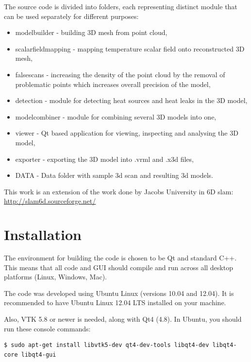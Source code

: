\documentclass[11pt]{article} %
\begin{document}
The source code is divided into folders, each representing distinct module that can be used separately for different purposes:

\begin{itemize}

\item modelbuilder - building 3D mesh from point cloud,
\item scalarfieldmapping - mapping temperature scalar field onto reconstructed 3D mesh,
\item falsescans - increasing the density of the point cloud by the removal of problematic points which increases overall precision of the model,
\item detection - module for detecting heat sources and heat leaks in the 3D model,
\item modelcombiner - module for combining several 3D models into one,
\item viewer - Qt based application for viewing, inspecting and analysing the 3D model,
\item exporter - exporting the 3D model into .vrml and .x3d files,
\item DATA - Data folder with sample 3d scan and resulting 3d models.

\end{itemize}

This work is an extension of the work done by Jacobs University in 6D slam: \url{http://slam6d.sourceforge.net/}

\newpage

\section{Installation}

The environment for building the code is chosen to be Qt and standard C++. This means that all code and GUI should compile and run across all desktop platforms (Linux, Windows, Mac).

The code was developed using Ubuntu Linux (versions 10.04 and 12.04). It is recommended to have Ubuntu Linux 12.04 LTS installed on your machine.

Also, VTK 5.8 or newer is needed, along with Qt4 (4.8). In Ubuntu, you should run these console commands:

\begin{verbatim}
$ sudo apt-get install libvtk5-dev qt4-dev-tools libqt4-dev libqt4-core libqt4-gui
\end{verbatim}
\end{document}
